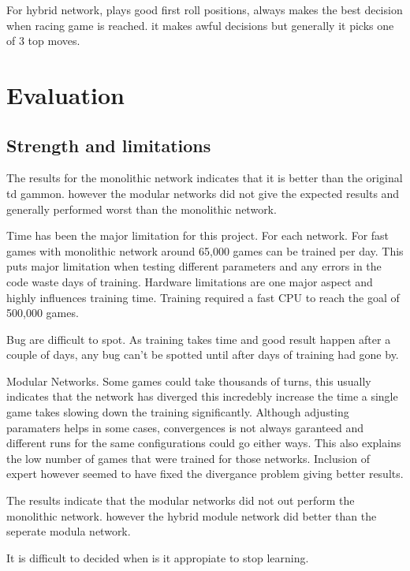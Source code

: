 \documentclass[12pt,a4paper]{article}
\begin{document}
For hybrid network, plays good first roll positions, always makes the best decision when racing game is reached. it makes awful decisions but generally it picks one of 3 top moves.  



\section{Evaluation}
\subsection{Strength and limitations}
The results for the monolithic network indicates that it is better than the original td gammon. however the modular networks did not give the expected results and generally performed worst than the monolithic network.

Time has been the major limitation for this project. For each network. For fast games with monolithic network around 65,000 games can be trained per day. This puts major limitation when testing different parameters and any errors in the code waste days of training. Hardware limitations are one major aspect and highly influences training time. Training required a fast CPU to reach the goal of 500,000 games. 

Bug are difficult to spot. As training takes time and good result happen after a couple of days, any bug can't be spotted until after days of training had gone by. 

Modular Networks. Some games could take thousands of turns, this usually indicates that the network has diverged this incredebly increase the time a single game takes slowing down the training significantly. Although adjusting paramaters helps in some cases, convergences is not always garanteed and different runs for the same configurations could go either ways. This also explains the low number of games that were trained for those networks. Inclusion of expert however seemed to have fixed the divergance problem giving better results. 

The results indicate that the modular networks did not out perform the monolithic network. however the hybrid module network did better than the seperate modula network. 

It is difficult to decided when is it appropiate to stop learning. 
\end{document}

